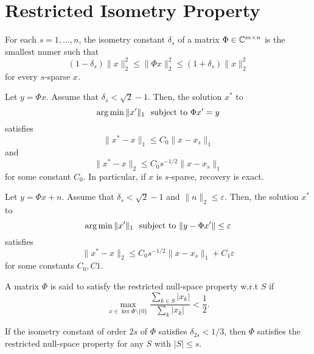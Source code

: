 \section{Restricted Isometry Property}

\begin{boxdefinition}
    For each $s=1,\dots,n$, the isometry constant $\delta_s$
    of a matrix $\Phi\in\mathbb{C}^{m\times n}$ is the smallest 
    numer such that 
    $$
    (1-\delta_s)\|x\|_2^2\leq\|\Phi x\|_2^2
    \leq(1+\delta_s)\|x\|_2^2
    $$
    for every $s$-sparse $x$.
\end{boxdefinition}

\begin{boxtheorem}
    Let $y=\Phi x$. Assume that $\delta_s<\sqrt{2}-1$.
    Then, the solution $x^*$ to
    $$
    \operatorname*{arg\,min}\|x'\|_1 \ \ \text{subject to } \Phi x'=y
    $$
    satisfies
    $$
    \|x^*-x\|_1\leq C_0\|x-x_s\|_1
    $$
    and
    $$
    \|x^*-x\|_2\leq C_0s^{-1/2}\|x-x_s\|_1
    $$
    for some constant $C_0$. In particular, if $x$ is
    $s$-sparse, recovery is exact.
\end{boxtheorem}

\begin{boxtheorem}
    Let $y=\Phi x+n$. Assume that $\delta_s<\sqrt{2}-1$
    and $\|n\|_2\leq\varepsilon$.
    Then, the solution $x^*$ to
    $$
    \operatorname*{arg\,min}\|x'\|_1 \ \ \text{subject to } 
    \|y-\Phi x'\|\leq\varepsilon
    $$
    satisfies
    $$
    \|x^*-x\|_2\leq C_0s^{-1/2}\|x-x_s\|_1+C_1\varepsilon
    $$
    for some constants $C_0,C1$.
\end{boxtheorem}

\begin{boxdefinition}
    A matrix $\Phi$ is said to satisfy the restricted
    null-space property w.r.t $S$ if 
    $$
    \max_{x\in\ker \Phi\setminus\{0\}}
    \frac{\sum_{k\in S}|x_k|}{\sum_k|x_k|}<\frac{1}{2}.
    $$
\end{boxdefinition}

\begin{boxtheorem}
    If the isometry constant of order $2s$ of $\Phi$
    satisfies $\delta_{2s}<1/3$, then $\Phi$
    satisfies the restricted null-space property
    for any $S$ with $|S|\leq s$.
\end{boxtheorem}